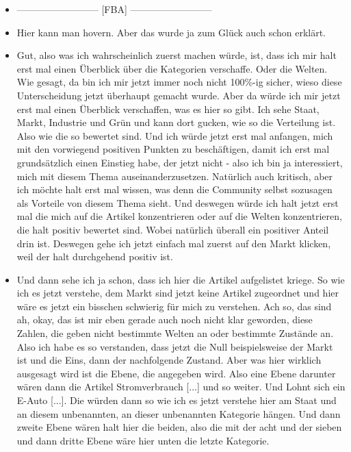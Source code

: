 {\begin{itemize}[]
    \item {--------------------------} [FBA] {--------------------------}
    \item {} Hier kann man hovern.
    Aber das wurde ja zum Glück auch schon erklärt.
    \item {} Gut, also was ich wahrscheinlich zuerst machen würde, ist, dass ich mir halt erst mal einen Überblick über die Kategorien verschaffe.
    Oder die Welten.
    Wie gesagt, da bin ich mir jetzt immer noch nicht 100\%-ig sicher, wieso diese Unterscheidung jetzt überhaupt gemacht wurde.
    Aber da würde ich mir jetzt erst mal einen Überblick verschaffen, was es hier so gibt.
    Ich sehe Staat, Markt, Industrie und Grün und kann dort gucken, wie so die Verteilung ist.
    Also wie die so bewertet sind.
    Und ich würde jetzt erst mal anfangen, mich mit den vorwiegend positiven Punkten zu beschäftigen, damit ich erst mal grundsätzlich einen Einstieg habe, der jetzt nicht - also ich bin ja interessiert, mich mit diesem Thema auseinanderzusetzen.
    Natürlich auch kritisch, aber ich möchte halt erst mal wissen, was denn die Community selbst sozusagen als Vorteile von diesem Thema sieht.
    Und deswegen würde ich halt jetzt erst mal die mich auf die Artikel konzentrieren oder auf die Welten konzentrieren, die halt positiv bewertet sind.
    Wobei natürlich überall ein positiver Anteil drin ist.
    Deswegen gehe ich jetzt einfach mal zuerst auf den Markt klicken, weil der halt durchgehend positiv ist.
    \item {} Und dann sehe ich ja schon, dass ich hier die Artikel aufgelistet kriege.
    So wie ich es jetzt verstehe, dem Markt sind jetzt keine Artikel zugeordnet und hier wäre es jetzt ein bisschen schwierig für mich zu verstehen.
    Ach so, das sind ah, okay, das ist mir eben gerade auch noch nicht klar geworden, diese Zahlen, die geben nicht bestimmte Welten an oder bestimmte Zustände an.
    Also ich habe es so verstanden, dass jetzt die Null beispielsweise der Markt ist und die Eins, dann der nachfolgende Zustand.
    Aber was hier wirklich ausgesagt wird ist die Ebene, die angegeben wird.
    Also eine Ebene darunter wären dann die Artikel \flqq Stromverbrauch [...]\frqq{} und so weiter.
    Und \flqq Lohnt sich ein E-Auto [...]\frqq{}.
    Die würden dann so wie ich es jetzt verstehe hier am Staat und an diesem unbenannten, an dieser unbenannten Kategorie hängen.
    Und dann zweite Ebene wären halt hier die beiden, also die mit der acht und der sieben und dann dritte Ebene wäre hier unten die letzte Kategorie.

\end{itemize}}
